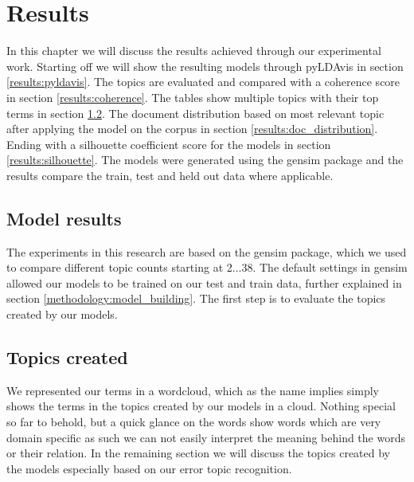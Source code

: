 \chapter{Results}
\label{ch:results}


In this chapter we will discuss the results achieved through our experimental work. Starting off we will show the resulting models through pyLDAvis in section \ref{results:pyldavis}. The topics are evaluated and compared with a coherence score in section \ref{results:coherence}. The tables show multiple topics with their top terms in section \ref{results:topics}. The document distribution based on most relevant topic after applying the model on the corpus in section \ref{results:doc_distribution}. Ending with a silhouette coefficient score for the models in  section \ref{results:silhouette}. The models were generated using the gensim package and the results compare the train, test and held out data where applicable. 

\section{Model results}\label{results:modelresults}
The experiments in this research are based on the gensim package, which we used to compare different topic counts starting at {2...38}. The default settings in gensim allowed our models to be trained on our test and train data, further explained in section \ref{methodology:model_building}. The first step is to evaluate the topics created by our models.


\FloatBarrier
\section{Topics created}\label{results:topics}
We represented our terms in a wordcloud, which as the name implies simply shows the terms in the topics created by our models in a cloud. Nothing special so far to behold, but a quick glance on the words show words which are very domain specific as such we can not easily interpret the meaning behind the words or their relation. In the remaining section we will discuss the topics created by the models especially based on our error topic recognition.

